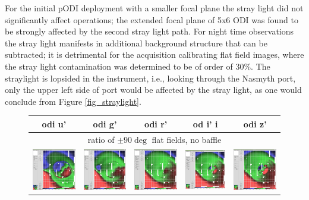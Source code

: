 \documentclass[]{spieman}
\begin{document}
For the initial pODI deployment with a smaller focal plane the stray light did
not significantly affect operations; the extended focal plane of 5x6 ODI was
found to be strongly affected by the second stray light path. For night time
observations the stray light manifests in additional background structure that
can be subtracted; it is detrimental for the acquisition calibrating flat field
images, where the stray light contamination was determined to be of order of
30\%. The straylight is lopsided in the instrument, i.e., looking through the
Nasmyth port, only the upper left side of port would be affected by the stray
light, as one would conclude from Figure \ref{fig_straylight}.

	\begin{figure} 
		\centering

		\begin{tabular}{ccccc} odi u' & odi g' & odi r' & od i'
			i & odi z' \\ \hline \multicolumn{5}{c}{ratio of $\pm 90 \deg$ 
				flat
				fields, no baffle} \\[1ex]
			
			\includegraphics[width=0.18\columnwidth]{images/nobaffle_u.jpeg}
			&
			\includegraphics[width=0.18\columnwidth]{images/nobaffle_g.jpeg}
			&
			\includegraphics[width=0.18\columnwidth]{images/nobaffle_r.jpeg}
			&
			\includegraphics[width=0.18\columnwidth]{images/nobaffle_i.jpeg}
			&
			\includegraphics[width=0.18\columnwidth]{images/nobaffle_z.jpeg}
			\\[2ex]
			

\end{tabular}
\end{figure}
\end{document}
